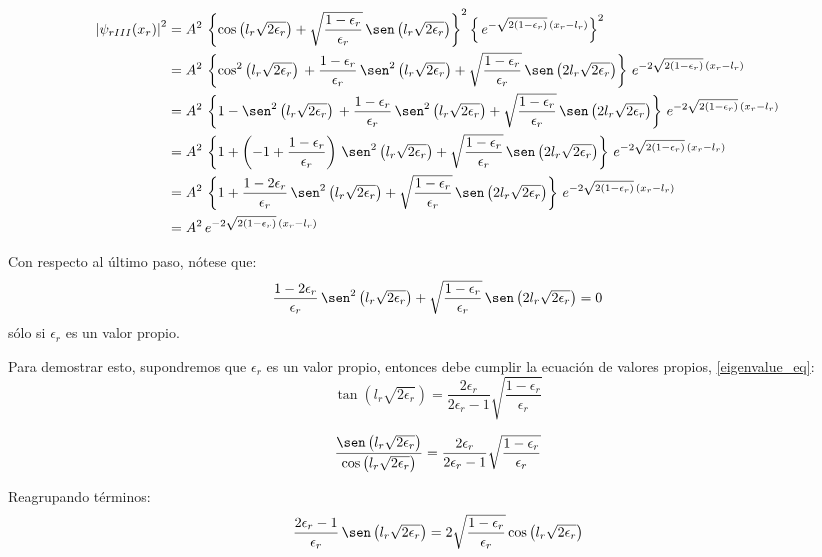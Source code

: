 \begin{align*}
\left|\psi_{rIII}(x_r)\right|^2
&= A^2\,\left\lbrace\cos\left(l_r\sqrt{2\epsilon_r}\right)
  + \sqrt{\frac{1-\epsilon_r}{\epsilon_r}}\,
    \sen\left(l_r\sqrt{2\epsilon_r}\right)
\right\rbrace^2
\left\lbrace
\,e^{-\sqrt{2(1-\epsilon_r)}\,(x_r-l_r)}
\right\rbrace^2\\
&= A^2\,\left\lbrace
 \cos^2\left(l_r\sqrt{2\epsilon_r}\right)\,
 + \frac{1-\epsilon_r}{\epsilon_r}\,\sen^2\left(l_r\sqrt{2\epsilon_r}\right)
 + \sqrt{\frac{1-\epsilon_r}{\epsilon_r}}\,
 \sen\left(2l_r\sqrt{2\epsilon_r}\right)
\right\rbrace
\,e^{-2\sqrt{2(1-\epsilon_r)}\,(x_r-l_r)}\\
&= A^2\,\left\lbrace
 1 - \sen^2\left(l_r\sqrt{2\epsilon_r}\right)\,
 + \frac{1-\epsilon_r}{\epsilon_r}\,\sen^2\left(l_r\sqrt{2\epsilon_r}\right)
 + \sqrt{\frac{1-\epsilon_r}{\epsilon_r}}\,
 \sen\left(2l_r\sqrt{2\epsilon_r}\right)
\right\rbrace
\,e^{-2\sqrt{2(1-\epsilon_r)}\,(x_r-l_r)}\\
&= A^2\,\left\lbrace
 1 
 + \left(-1+\frac{1-\epsilon_r}{\epsilon_r}\right)\,\sen^2\left(l_r\sqrt{2\epsilon_r}\right)
 + \sqrt{\frac{1-\epsilon_r}{\epsilon_r}}\,
 \sen\left(2l_r\sqrt{2\epsilon_r}\right)
\right\rbrace
\,e^{-2\sqrt{2(1-\epsilon_r)}\,(x_r-l_r)}\\
&= A^2\,\left\lbrace
 1 
 + \frac{1-2\epsilon_r}{\epsilon_r}\,\sen^2\left(l_r\sqrt{2\epsilon_r}\right)
 + \sqrt{\frac{1-\epsilon_r}{\epsilon_r}}\,
 \sen\left(2l_r\sqrt{2\epsilon_r}\right)
\right\rbrace
\,e^{-2\sqrt{2(1-\epsilon_r)}\,(x_r-l_r)}\\
&= A^2\,e^{-2\sqrt{2(1-\epsilon_r)}\,(x_r-l_r)}
\end{align*}

Con respecto al último paso, nótese que:
\[
 \frac{1-2\epsilon_r}{\epsilon_r}\,\sen^2\left(l_r\sqrt{2\epsilon_r}\right)
 + \sqrt{\frac{1-\epsilon_r}{\epsilon_r}}\,
 \sen\left(2l_r\sqrt{2\epsilon_r}\right) = 0
\]
sólo si $\epsilon_r$ es un valor propio.  

Para demostrar esto, supondremos que $\epsilon_r$ es un valor propio, entonces
debe cumplir la ecuación de valores propios, \ref{eigenvalue_eq}:
\[
\tan\left(l_r\sqrt{2\epsilon_r}\right)
=
\frac{2\epsilon_r}{2\epsilon_r-1}
\sqrt{\frac{1-\epsilon_r}{\epsilon_r}}
\]

\[
\frac{\sen\left(l_r\sqrt{2\epsilon_r}\right)}
{\cos\left(l_r\sqrt{2\epsilon_r}\right)}
=
\frac{2\epsilon_r}{2\epsilon_r-1}
\sqrt{\frac{1-\epsilon_r}{\epsilon_r}}
\]

Reagrupando términos:
\[
\frac{2\epsilon_r-1}{\epsilon_r}\,
\sen\left(l_r\sqrt{2\epsilon_r}\right)
=
2\sqrt{\frac{1-\epsilon_r}{\epsilon_r}}
\cos\left(l_r\sqrt{2\epsilon_r}\right)
\]

